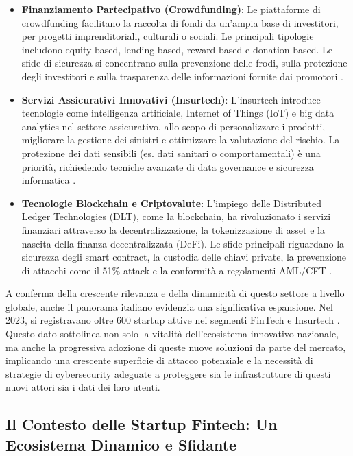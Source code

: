\begin{itemize}
    \item \textbf{Finanziamento Partecipativo (Crowdfunding)}: Le piattaforme di crowdfunding facilitano la raccolta di fondi da un'ampia base di investitori, per progetti imprenditoriali, culturali o sociali. Le principali tipologie includono equity-based, lending-based, reward-based e donation-based. Le sfide di sicurezza si concentrano sulla prevenzione delle frodi, sulla protezione degli investitori e sulla trasparenza delle informazioni fornite dai promotori \cite{hornuf2018crowdfunding}.
    
    \item \textbf{Servizi Assicurativi Innovativi (Insurtech)}: L'insurtech introduce tecnologie come intelligenza artificiale, Internet of Things (IoT) e big data analytics nel settore assicurativo, allo scopo di personalizzare i prodotti, migliorare la gestione dei sinistri e ottimizzare la valutazione del rischio. La protezione dei dati sensibili (es. dati sanitari o comportamentali) è una priorità, richiedendo tecniche avanzate di data governance e sicurezza informatica \cite{eling2018insurtech}.
    
    \item \textbf{Tecnologie Blockchain e Criptovalute}: L'impiego delle Distributed Ledger Technologies (DLT), come la blockchain, ha rivoluzionato i servizi finanziari attraverso la decentralizzazione, la tokenizzazione di asset e la nascita della finanza decentralizzata (DeFi). Le sfide principali riguardano la sicurezza degli smart contract, la custodia delle chiavi private, la prevenzione di attacchi come il 51\% attack e la conformità a regolamenti AML/CFT \cite{catalini2016blockchain}.
    \end{itemize}

A conferma della crescente rilevanza e della dinamicità di questo settore a livello globale, anche il panorama italiano evidenzia una significativa espansione. Nel 2023, si registravano oltre 600 startup attive nei segmenti FinTech e Insurtech \cite{fintech_numeri}. Questo dato sottolinea non solo la vitalità dell'ecosistema innovativo nazionale, ma anche la progressiva adozione di queste nuove soluzioni da parte del mercato, implicando una crescente superficie di attacco potenziale e la necessità di strategie di cybersecurity adeguate a proteggere sia le infrastrutture di questi nuovi attori sia i dati dei loro utenti.
\subsection{Il Contesto delle Startup Fintech: Un Ecosistema Dinamico e Sfidante}

